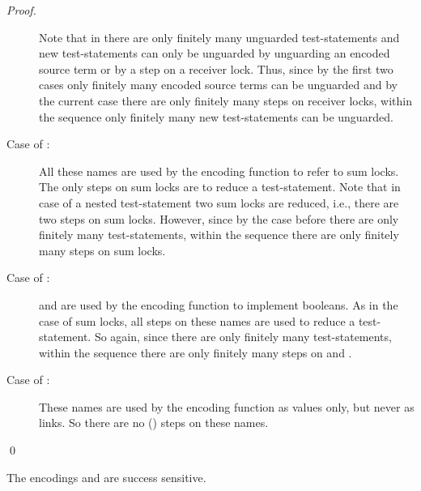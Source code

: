\documentclass[]{llncs}
\begin{document}
\begin{proof}
\begin{description}
			Note that in  there are only finitely many unguarded test-statements and new test-statements can only be unguarded by unguarding an encoded source term or by a step on a receiver lock. Thus, since by the first two cases only finitely many encoded source terms can be unguarded and by the current case there are only finitely many steps on receiver locks, within the sequence  only finitely many new test-statements can be unguarded.
		\item[Case of :] All these names are used by the encoding function to refer to sum locks. The only steps on sum locks are to reduce a test-statement. Note that in case of a nested test-statement two sum locks are reduced, i.e., there are two steps on sum locks. However, since by the case before there are only finitely many test-statements, within the sequence  there are only finitely many steps on sum locks.
		\item[Case of :]  and  are used by the encoding function to implement booleans. As in the case of sum locks, all steps on these names are used to reduce a test-statement. So again, since there are only finitely many test-statements, within the sequence  there are only finitely many steps on  and .
		\item[Case of :] These names are used by the encoding function as values only, but never as links. So there are no (\admin) steps on these names.
	\end{description}
	\qed
\end{proof}

\begin{lemma} \label{lem:successSensitiveness}
	The encodings  and  are success sensitive.
\end{lemma}
\end{document}
